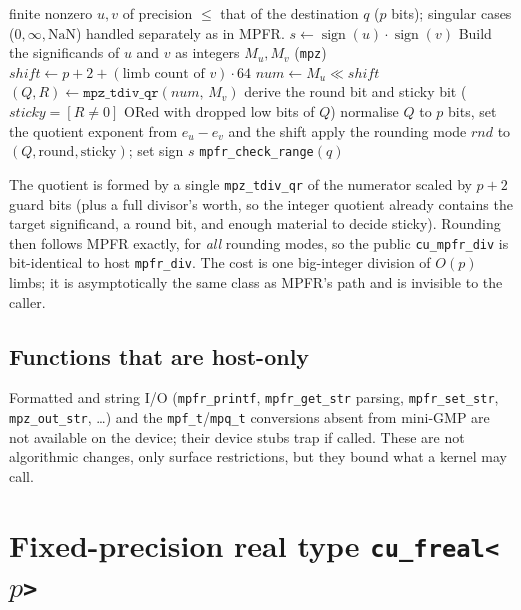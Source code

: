\documentclass[11pt,a4paper]{article}
\newcommand{\code}[1]{\texttt{#1}}
\newcommand{\PB}{\ensuremath{p}}
\begin{document}
\begin{algorithm}[h]
\caption{\code{mpfr\_div\_cuda}$(u,v,\mathit{rnd})$: device-correct, correctly-rounded division}
\label{alg:div}
\begin{algorithmic}[1]
\Require finite nonzero $u,v$ of precision $\le$ that of the destination $q$ (\PB{} bits); singular cases ($0,\infty,\mathrm{NaN}$) handled separately as in MPFR.
\State $s \gets \operatorname{sign}(u)\cdot\operatorname{sign}(v)$
\State Build the significands of $u$ and $v$ as integers $M_u,M_v$ (\code{mpz})
\State $\mathit{shift} \gets \PB + 2 + (\text{limb count of }v)\cdot 64$ 
\State $\mathit{num} \gets M_u \ll \mathit{shift}$
\State $(Q,R) \gets \code{mpz\_tdiv\_qr}(\mathit{num},\,M_v)$ 
\State derive the round bit and sticky bit ($\mathit{sticky}=[R\neq 0]$ ORed with dropped low bits of $Q$)
\State normalise $Q$ to \PB{} bits, set the quotient exponent from $e_u-e_v$ and the shift
\State apply the rounding mode $\mathit{rnd}$ to $(Q,\text{round},\text{sticky})$; set sign $s$
\State \Return \code{mpfr\_check\_range}$(q)$ \Comment{matches host \code{mpfr\_div} bit-for-bit}
\end{algorithmic}
\end{algorithm}

The quotient is formed by a single \code{mpz\_tdiv\_qr} of the numerator scaled by
$\PB+2$ guard bits (plus a full divisor's worth, so the integer quotient already
contains the target significand, a round bit, and enough material to decide
sticky). Rounding then follows MPFR exactly, for \emph{all} rounding modes, so
the public \code{cu\_mpfr\_div} is bit-identical to host \code{mpfr\_div}. The
cost is one big-integer division of $O(\PB)$ limbs; it is asymptotically the same
class as MPFR's path and is invisible to the caller.

\subsection{Functions that are host-only}
Formatted and string I/O (\code{mpfr\_printf}, \code{mpfr\_get\_str} parsing,
\code{mpfr\_set\_str}, \code{mpz\_out\_str}, \ldots) and the \code{mpf\_t}/\code{mpq\_t}
conversions absent from mini-GMP are not available on the device; their device
stubs trap if called. These are not algorithmic changes, only surface
restrictions, but they bound what a kernel may call.


\section{Fixed-precision real type \texorpdfstring{\code{cu\_freal<\PB>}}{cu\_freal<PB>}}
\label{sec:freal}
\end{document}
